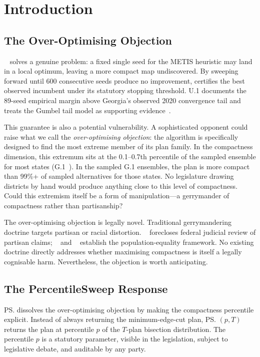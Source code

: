 \section{Introduction}
\label{sec:introduction}

\subsection{The Over-Optimising Objection}

\cs{}~\citep{b16paper} solves a genuine problem: a fixed single seed for
the METIS heuristic may land in a local optimum, leaving a more compact map
undiscovered.
By sweeping forward until 600 consecutive seeds produce no improvement, \cs{}
certifies the best observed incumbent under its statutory stopping threshold.
U.1 documents the 89-seed empirical margin above Georgia's observed 2020
convergence tail and treats the Gumbel tail model as supporting
evidence~\citep{b16paper}.

This guarantee is also a potential vulnerability.
A sophisticated opponent could raise what we call the \emph{over-optimising
objection}: the algorithm is specifically designed to find the most extreme
member of its plan family.
In the compactness dimension, this extremum sits at the 0.1--0.7th percentile
of the sampled \recom{} ensemble for most states (G.1~\citep{g1paper}).
In the sampled G.1 ensembles, the plan is more compact than 99\%+ of sampled
\recom{} alternatives for those states.
No legislature drawing districts by hand would produce anything close to
this level of compactness.
Could this extremism itself be a form of manipulation---a gerrymander of
compactness rather than partisanship?

The over-optimising objection is legally novel.
Traditional gerrymandering doctrine targets partisan or racial distortion.
\rucho{}~\citep{rucho2019} forecloses federal judicial review of partisan
claims; \wesberry{}~\citep{wesberry1964} and \karcher{}~\citep{karcher1983}
establish the population-equality framework.
No existing doctrine directly addresses whether maximising compactness is
itself a legally cognisable harm.
Nevertheless, the objection is worth anticipating.

\subsection{The PercentileSweep Response}

\ps{} dissolves the over-optimising objection by making the compactness
percentile explicit.
Instead of always returning the minimum-edge-cut plan, \ps{}$(p, T)$ returns
the plan at percentile $p$ of the $T$-plan bisection distribution.
The percentile $p$ is a statutory parameter, visible in the legislation,
subject to legislative debate, and auditable by any party.

